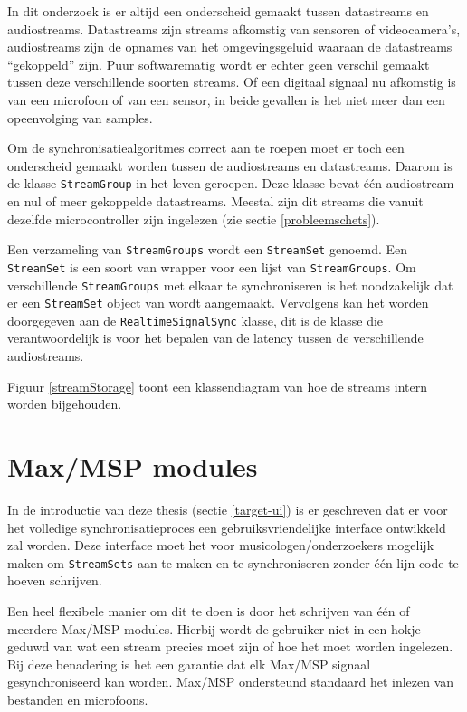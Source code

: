 In dit onderzoek is er altijd een onderscheid gemaakt tussen datastreams en audiostreams. Datastreams zijn streams afkomstig van sensoren of videocamera's, audiostreams zijn de opnames van het omgevingsgeluid waaraan de datastreams ``gekoppeld'' zijn. Puur softwarematig wordt er echter geen verschil gemaakt tussen deze verschillende soorten streams. Of een digitaal signaal nu afkomstig is van een microfoon of van een sensor, in beide gevallen is het niet meer dan een opeenvolging van samples.

Om de synchronisatiealgoritmes correct aan te roepen moet er toch een onderscheid gemaakt worden tussen de audiostreams en datastreams. Daarom is de klasse \texttt{StreamGroup} in het leven geroepen. Deze klasse bevat één audiostream en nul of meer gekoppelde datastreams. Meestal zijn dit streams die vanuit dezelfde microcontroller zijn ingelezen (zie sectie \ref{probleemschets}).

Een verzameling van \texttt{StreamGroups} wordt een \texttt{StreamSet} genoemd. Een \texttt{StreamSet} is een soort van wrapper voor een lijst van \texttt{StreamGroups}. Om verschillende \texttt{StreamGroups} met elkaar te synchroniseren is het noodzakelijk dat er een \texttt{StreamSet} object van wordt aangemaakt. Vervolgens kan het worden doorgegeven aan de  \texttt{RealtimeSignalSync} klasse, dit is de klasse die verantwoordelijk is voor het bepalen van de latency tussen de verschillende audiostreams. 

Figuur \ref{streamStorage} toont een klassendiagram van hoe de streams intern worden bijgehouden.

\section{Max/MSP modules}

In de introductie van deze thesis (sectie \ref{target-ui}) is er geschreven dat er voor het volledige synchronisatieproces een gebruiksvriendelijke interface ontwikkeld zal worden. Deze interface moet het voor musicologen/onderzoekers mogelijk maken om \texttt{StreamSets} aan te maken en te synchroniseren zonder één lijn code te hoeven schrijven.

Een heel flexibele manier om dit te doen is door het schrijven van één of meerdere Max/MSP modules. Hierbij wordt de gebruiker niet in een hokje geduwd van wat een stream precies moet zijn of hoe het moet worden ingelezen. Bij deze benadering is het een garantie dat elk Max/MSP signaal gesynchroniseerd kan worden. Max/MSP ondersteund standaard het inlezen van bestanden en microfoons.

